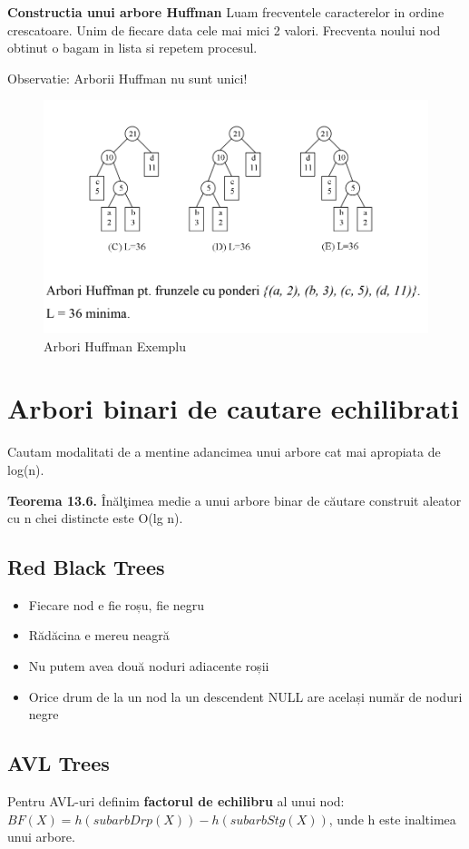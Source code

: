 \documentclass[11pt,a4paper]{article}
\theoremstyle{definition}
\theoremstyle{plain}
\theoremstyle{remark}
\begin{document}
\textbf{Constructia unui arbore Huffman}
Luam frecventele caracterelor in ordine crescatoare. Unim de fiecare data cele mai mici 2 valori. Frecventa noului nod obtinut o bagam in lista si repetem procesul.

Observatie: Arborii Huffman nu sunt unici!

\begin{figure}[H]
    \centering
    \includegraphics[width=0.75\linewidth]{huffman.png}
    \caption{Arbori Huffman Exemplu}
    \label{fig:enter-label}
\end{figure}

\section{Arbori binari de cautare echilibrati}

Cautam modalitati de a mentine adancimea unui arbore cat mai apropiata de log(n).

\textbf{Teorema 13.6.} Înălţimea medie a unui arbore binar de căutare construit aleator cu n chei distincte este O(lg n).

\subsection{Red Black Trees}
\begin{itemize}
    \item Fiecare nod e ﬁe roșu, ﬁe negru
    \item Rădăcina e mereu neagră
    \item Nu putem avea două noduri adiacente roșii
    \item Orice drum de la un nod la un descendent NULL are același număr de noduri negre
\end{itemize}

\subsection{AVL Trees}
Pentru AVL-uri definim \textbf{factorul de echilibru} al unui nod: $BF(X) = h(subarbDrp(X)) - h(subarbStg(X))$, unde h este inaltimea unui arbore.
\end{document}
